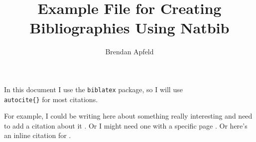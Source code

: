 \documentclass{article}
\title{Example File for Creating Bibliographies Using Natbib}
\author{Brendan Apfeld}
\begin{document}
\maketitle

In this document I use the \texttt{biblatex} package, so I will use \texttt{\\autocite\{\}} for most citations.

For example, I could be writing here about something really interesting and need to add a citation about it \citep{collier_2011}. Or I might need one with a specific page \citep[34-40]{lijphart_1971}. Or here's an inline citation for \citet{sartori_1970}.

\singlespacing
\clearpage %
\centering %

\end{document}
